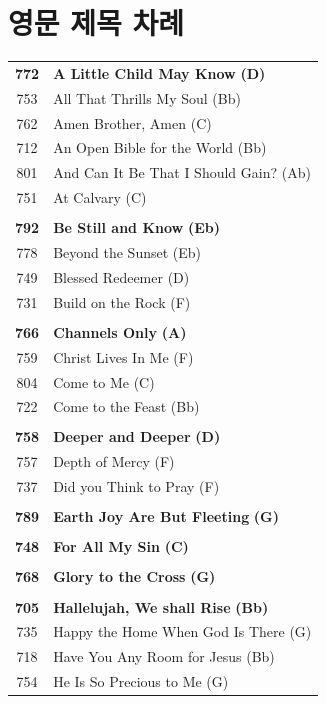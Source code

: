 \section*{영문 제목 차례}
\begin{small}
\begin{supertabular}{c l}
\textbf{772} & \textbf{A Little Child May Know} \textbf{(D)} \\
753 & All That Thrills My Soul (Bb) \\
762 & Amen Brother, Amen (C) \\
712 & An Open Bible for the World (Bb) \\
801 & And Can It Be That I Should Gain? (Ab) \\
751 & At Calvary (C) \\
 & \\
\textbf{792} & \textbf{Be Still and Know} \textbf{(Eb)} \\
778 & Beyond the Sunset (Eb) \\
749 & Blessed Redeemer (D) \\
731 & Build on the Rock (F) \\
 & \\
\textbf{766} & \textbf{Channels Only} \textbf{(A)} \\
759 & Christ Lives In Me (F) \\
804 & Come to Me (C) \\
722 & Come to the Feast (Bb) \\
 & \\
\textbf{758} & \textbf{Deeper and Deeper} \textbf{(D)} \\
757 & Depth of Mercy (F) \\
737 & Did you Think to Pray (F) \\
 & \\
\textbf{789} & \textbf{Earth Joy Are But Fleeting} \textbf{(G)} \\
 & \\
\textbf{748} & \textbf{For All My Sin} \textbf{(C)} \\
 & \\
\textbf{768} & \textbf{Glory to the Cross} \textbf{(G)} \\
 & \\
\textbf{705} & \textbf{Hallelujah, We shall Rise} \textbf{(Bb)} \\
735 & Happy the Home When God Is There (G) \\
718 & Have You Any Room for Jesus (Bb) \\
754 & He Is So Precious to Me (G) \\

\end{supertabular}
\end{small}

